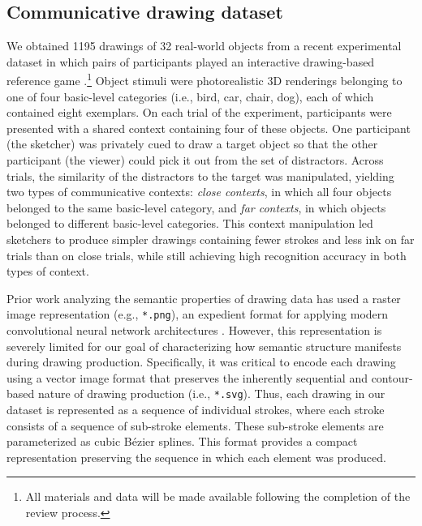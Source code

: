 \documentclass[10pt,letterpaper]{article}
\begin{document}
\subsection{Communicative drawing dataset}
We obtained 1195 drawings of 32 real-world objects from a recent experimental dataset in which pairs of participants played an interactive drawing-based reference game .\footnote{All materials and data will be made available following the completion of the review process.}
Object stimuli were photorealistic 3D renderings belonging to one of four basic-level categories (i.e., bird, car, chair, dog), each of which contained eight exemplars. %
On each trial of the experiment, participants were presented with a shared context containing four of these objects. 
One participant (the sketcher) was privately cued to draw a target object so that the other participant (the viewer) could pick it out from the set of distractors. %
Across trials, the similarity of the distractors to the target was manipulated, yielding two types of communicative contexts: \textit{close contexts}, in which all four objects belonged to the same basic-level category, and \textit{far contexts}, in which objects belonged to different basic-level categories. %
This context manipulation led sketchers to produce simpler drawings containing fewer strokes and less ink on far trials than on close trials, while still achieving high recognition accuracy in both types of context.%
 

Prior work analyzing the semantic properties of drawing data has used a raster image representation (e.g., \texttt{*.png}), an expedient format for applying modern convolutional neural network architectures . 
However, this representation is severely limited for our goal of characterizing how semantic structure manifests during drawing production. 
Specifically, it was critical to encode each drawing using a vector image format that preserves the inherently sequential and contour-based nature of drawing production (i.e., \texttt{*.svg}). 
Thus, each drawing in our dataset is represented as a sequence of individual strokes, where each stroke consists of a sequence of sub-stroke elements.
These sub-stroke elements are parameterized as cubic Bézier splines.
This format provides a compact representation preserving the sequence in which each element was produced.%
\end{document}
